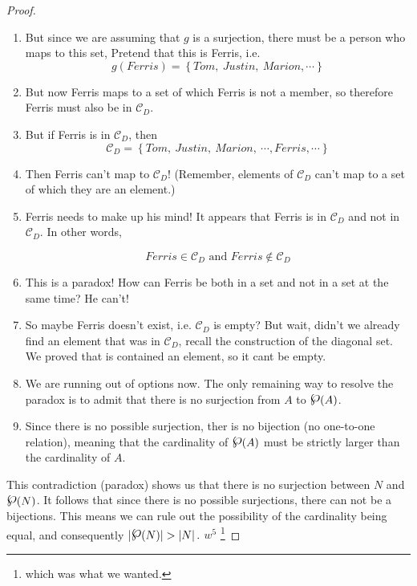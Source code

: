 \begin{proof}
\begin{enumerate}
\item But since we are assuming that $g$ is a surjection, there must be a person who maps to this set, Pretend that this is Ferris, i.e. 
$$ g(Ferris) =  \left\{ Tom, ~ Justin, ~ Marion, \cdots \right\}$$

\item But now Ferris maps to a set of which Ferris is not a member, so therefore Ferris must also be in $\mathcal{C}_D$.  

\item But if Ferris is in $\mathcal{C}_D$, then
$$\mathcal{C}_D = \left\{ Tom, ~ Justin, ~ Marion,~ \cdots, Ferris, \cdots \right\}$$

\item Then Ferris can't map to $\mathcal{C}_D$!  (Remember, elements of  $\mathcal{C}_D$ can't map to a set of which they are an element.)

\item Ferris needs to make up his mind!  It appears that Ferris is  in $\mathcal{C}_D$ and not in $\mathcal{C}_D$.  In other words, 

$$Ferris \in \mathcal{C}_D \textrm { and } Ferris \notin \mathcal{C}_D$$

\item This is a paradox! How can Ferris be both in a set and not in a set at the same time?  He can't!  

\item So maybe Ferris doesn't exist, i.e.  $ \mathcal{C}_D$ is empty?  But wait, didn't we already find an element that was in  $\mathcal{C}_D$, recall the construction of the diagonal set.  We proved that is contained an element, so it cant be empty.

\item We are running out of options now.  The only remaining way to resolve the paradox is to admit that there is no surjection from $A$ to $\powerset(A)$.  

\item Since there is no possible surjection, ther is no bijection (no one-to-one relation), meaning that the cardinality of $\powerset(A)$ must be strictly larger than the cardinality of $A$.

\end{enumerate}
This contradiction (paradox) shows us that there is no surjection between $N$ and $\powerset (N)$.  It follows that since there is no possible surjections, there can not be a bijections.  This means we can  rule out the possibility of the cardinality being equal, and consequently
$ \left| \powerset (N) \right| > \left | N\right|.$ $w^5$ \footnote{which was what we wanted.}
\end{proof}


